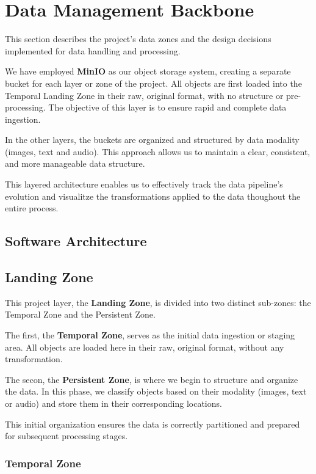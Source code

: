 \documentclass[12pt]{article}
\begin{document}
\section{Data Management Backbone}

This section describes the project's data zones and the design decisions implemented for data handling and processing.

We have employed \textbf{MinIO} as our object storage system, creating a separate bucket for each layer or zone of the project. All objects are first loaded into the Temporal Landing Zone in their raw, original format, with no structure or pre-processing. The objective of this layer is to ensure rapid and complete data ingestion.

In the other layers, the buckets are organized and structured by data modality (images, text and audio). This approach allows us to maintain a clear, consistent, and more manageable data structure.

This layered architecture enables us to effectively track the data pipeline's evolution and visualitze the transformations applied to the data thoughout the entire process.

\subsection{Software Architecture}

\subsection{Landing Zone}

This project layer, the \textbf{Landing Zone}, is divided into two distinct sub-zones: the Temporal Zone and the Persistent Zone.

The first, the \textbf{Temporal Zone}, serves as the initial data ingestion or staging area. All objects are loaded here in their raw, original format, without any transformation.

The secon, the \textbf{Persistent Zone}, is where we begin to structure and organize the data. In this phase, we classify objects based on their modality (images, text or audio) and store them in their corresponding locations.

This initial organization ensures the data is correctly partitioned and prepared for subsequent processing stages.

\subsubsection{Temporal Zone}
\end{document}
